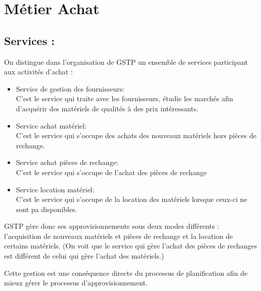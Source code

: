 \section{Métier Achat}


\subsection{Services :}
On distingue dans l'organisation de GSTP un ensemble de services participant aux activités d'achat :
\begin{itemize}

   \item Service de gestion des fournisseurs: \\


C'est le service qui traite avec les fournisseurs, étudie les marchés afin d'acquérir des matériels de qualités à des prix intéressants.

    \item Service achat matériel:  \\


C'est le service qui s'occupe des achats des nouveaux matériels hors pièces de rechange.

    \item Service achat pièces de rechange: \\


C'est le service qui s'occupe de l'achat des pièces de rechange

    \item Service location matériel: \\


C'est le service qui s'occupe de la location des matériels lorsque ceux-ci ne sont pa disponibles.
\end{itemize}

GSTP gère donc ses approvisionnements sous deux modes différents : \\
l'acquisition de nouveaux matériels et pièces de rechange et la location de certains matériels.
(On voit que le service qui gère l'achat des pièces de rechanges est différent de celui qui gère l'achat des matériels.)

Cette gestion est une conséquence directe du processus de planification afin de mieux gérer le processus d'approvisionnement.

